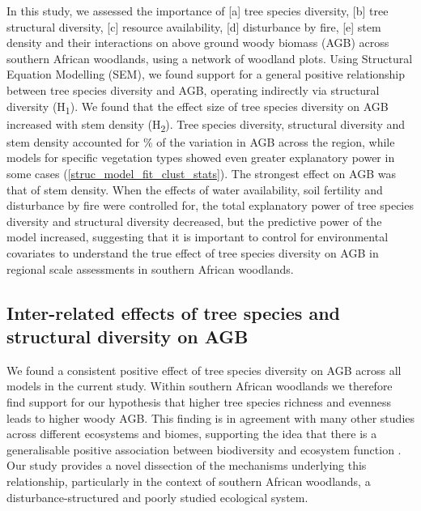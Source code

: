 \documentclass[11pt,a4paper]{article}
\begin{document}
In this study, we assessed the importance of [a] tree species diversity, [b] tree structural diversity, [c] resource availability, [d] disturbance by fire, [e] stem density and their interactions on above ground woody biomass (AGB) across southern African woodlands, using a network of \nplots{} woodland plots. Using Structural Equation Modelling (SEM), we found support for a general positive relationship between tree species diversity and AGB, operating indirectly via structural diversity (H\textsubscript{1}). We found that the effect size of tree species diversity on AGB increased with stem density (H\textsubscript{2}).  Tree species diversity, structural diversity and stem density accounted for \smrsq{}\% of the variation in AGB across the region, while models for specific vegetation types showed even greater explanatory power in some cases (\autoref{struc_model_fit_clust_stats}). The strongest effect on AGB was that of stem density. When the effects of water availability, soil fertility and disturbance by fire were controlled for, the total explanatory power of tree species diversity and structural diversity decreased, but the predictive power of the model increased, suggesting that it is important to control for environmental covariates to understand the true effect of tree species diversity on AGB in regional scale assessments in southern African woodlands.

\subsection{Inter-related effects of tree species and structural diversity on AGB}

We found a consistent positive effect of tree species diversity on AGB across all models in the current study. Within southern African woodlands we therefore find support for our hypothesis that higher tree species richness and evenness leads to higher woody AGB. This finding is in agreement with many other studies across different ecosystems and biomes, supporting the idea that there is a generalisable positive association between biodiversity and ecosystem function \citep{Liang2016, Cardinale2009}. Our study provides a novel dissection of the mechanisms underlying this relationship, particularly in the context of southern African woodlands, a disturbance-structured and poorly studied ecological system.
\end{document}
